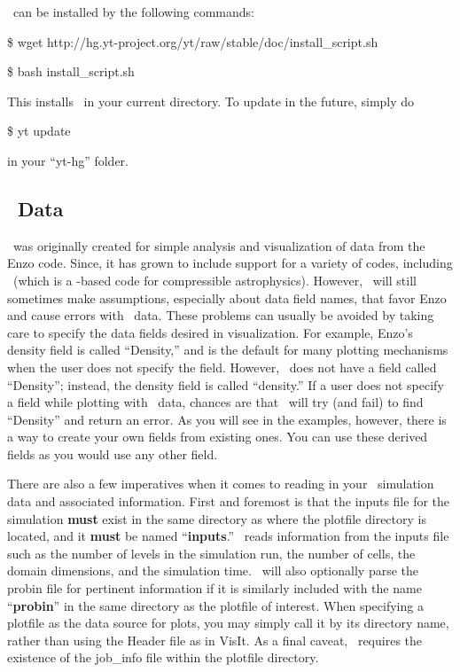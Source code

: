 \yt\ can be installed by the following commands:

\$ wget http://hg.yt-project.org/yt/raw/stable/doc/install\_script.sh

\$ bash install\_script.sh

This installs \yt\ in your current directory. To update \yt in the
future, simply do

\$ yt update

in your ``yt-hg'' folder.

\subsection{\amrex\ Data}

\yt\ was originally created for simple analysis and visualization of
data from the Enzo code. Since, it has grown to include support for a
variety of codes, including \castro\ (which is a \amrex-based code
for compressible astrophysics). However, \yt\ will still sometimes
make assumptions, especially about data field names, that favor Enzo
and cause errors with \amrex\ data. These problems can usually be
avoided by taking care to specify the data fields desired in
visualization. For example, Enzo's density field is called
``Density,'' and is the default for many plotting mechanisms when the
user does not specify the field. However, \pelelm\ does not have a field
called ``Density''; instead, the density field is called ``density.''
If a user does not specify a field while plotting with \pelelm\ data,
chances are that \yt\ will try (and fail) to find ``Density'' and return
an error. As you will see in the examples, however, there is a way to
create your own fields from existing ones. You can use these derived
fields as you would use any other field.

There are also a few imperatives when it comes to reading in your
\amrex\ simulation data and associated information. First and foremost
is that the inputs file for the simulation {\bf must} exist in the
same directory as where the plotfile directory is located, and it {\bf
  must} be named ``{\bf inputs}.'' \yt\ reads information from the
inputs file such as the number of levels in the simulation run, the
number of cells, the domain dimensions, and the simulation time. \yt\
will also optionally parse the probin file for pertinent information
if it is similarly included with the name ``{\bf probin}'' in the same
directory as the plotfile of interest. When specifying a plotfile as
the data source for plots, you may simply call it by its directory
name, rather than using the Header file as in VisIt. As a final
caveat, \yt\ requires the existence of the job\_info file within the plotfile
directory.

